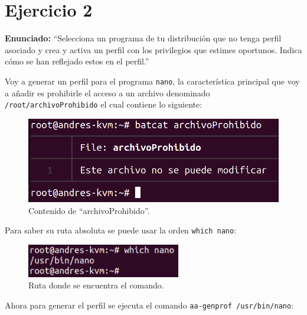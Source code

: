 \documentclass{article}
\begin{document}
\section{Ejercicio 2}
\textbf{Enunciado: }``Selecciona un programa de tu distribución que no tenga perfil asociado y crea y activa un perfil con los privilegios que estimes oportunos. Indica cómo se han reflejado estos en el perfil.''

\bigskip

Voy a generar un perfil para el programa \verb|nano|, la característica principal que voy a añadir es prohibirle el acceso a un archivo denominado \verb|/root/archivoProhibido| el cual contiene lo siguiente:


\begin{figure}[H]
    \centering
    \includegraphics[width=\textwidth]{imagenes/Captura desde 2022-10-18 16-41-05.png}
    \caption{Contenido de ``archivoProhibido''.}
\end{figure}

\bigskip

Para saber su ruta absoluta se puede usar la orden \verb|which nano|:


\begin{figure}[H]
    \centering
    \includegraphics[width=0.6\textwidth]{imagenes/which.png}
    \caption{Ruta donde se encuentra el comando.}
\end{figure}

\newpage

Ahora para generar el perfil se ejecuta el comando \verb|aa-genprof /usr/bin/nano|:
\end{document}
